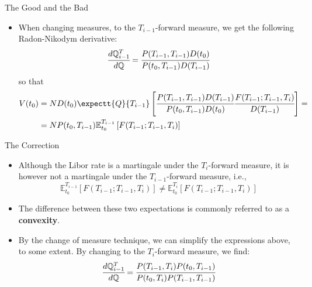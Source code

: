 \documentclass{beamer}
\begin{document}
\begin{frame}{The Good and the Bad}
\begin{itemize}
\item When changing measures, to the $T_{i-1}$-forward measure, we get the following Radon-Nikodym derivative:
\begin{equation}
\cfrac{d\mathbb{Q}^T_{i-1}}{d\mathbb{Q}}=\cfrac{P(T_{i-1},T_{i-1})D(t_0)}{P(t_0,T_{i-1})D(T_{i-1})}
\end{equation}
so that
\begin{equation}
\begin{aligned}
V(t_0) &= N D(t_0)\expectt{Q}{T_{i-1}}\left[\cfrac{P(T_{i-1},T_{i-1})D(T_{i-1})}{P(t_0,T_{i-1})D(t_0)}\cfrac{F(T_{i-1};T_{i-1},T_i)}{D(T_{i-1})}\right] = \\
&= N P(t_0,T_{i-1})\mathbb{E}^{T_{i-1}}_{t_0}\left[F(T_{i-1};T_{i-1},T_i)\right]
\end{aligned}
\end{equation}
\end{itemize}
\end{frame}

\begin{frame}{The Correction}
\begin{itemize}
\item Although the Libor rate is a martingale under the $T_i$-forward
measure, it is however not a martingale under the $T_{i-1}$-forward measure, i.e.,
\begin{equation}
	\mathbb{E}^{T_{i-1}}_{t_0}\left[F(T_{i-1};T_{i-1},T_i)\right]\neq \mathbb{E}^{T_i}_{t_0}\left[F(T_{i-1};T_{i-1},T_i)\right]
\end{equation}
\item The difference between these two expectations is commonly referred to as a \textbf{convexity}. 		
\item By the change of measure technique, we can simplify the expressions above, to some extent. By changing to the $T_i$-forward measure, we find:
\begin{equation}
	\cfrac{d\mathbb{Q}^T_{i-1}}{d\mathbb{Q}}=\cfrac{P(T_{i-1},T_i)P(t_0,T_{i-1})}{P(t_0,T_i)P(T_{i-1},T_{i-1})}
\end{equation}
\end{itemize}
\end{frame}
\end{document}
